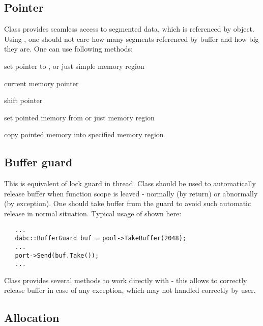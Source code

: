 \subsection{Pointer}

Class  provides seamless access to 
segmented data, which is referenced by  object.
Using , one should not care how many segments 
referenced by buffer and how big they are. One can use following methods:
\bbul
\item[\func{reset()}]  set pointer to ,  or just simple memory region   
\item[\func{ptr()}]   current memory pointer
\item[\func{shift()}]  shift pointer   
\item[\func{copyfrom()}]  set pointed memory from  or just memory region
\item[\func{copyto()}]  copy pointed memory into specified memory region
\ebul   


\subsection{Buffer guard}

This is equivalent of lock guard in thread.
Class  should be used to automatically release 
buffer when function scope is leaved - normally (by return) or abnormally 
(by exception). One should  take buffer from the guard
to avoid such automatic release in normal situation. Typical usage 
of  shown here:

\begin{small}
\begin{verbatim}     
   ...
   dabc::BufferGuard buf = pool->TakeBuffer(2048);
   ...
   port->Send(buf.Take());
   ...
\end{verbatim}     
\end{small}

Class  provides several methods to work directly 
with  - this allows to correctly release buffer
in case of any exception, which may not handled correctly by user.  


\subsection{Allocation}

